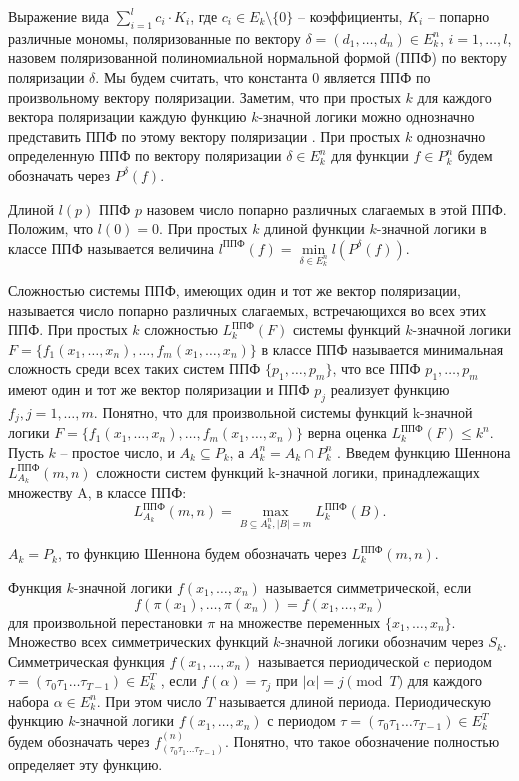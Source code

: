 \documentclass[bibliography=totoc, a4paper, 12pt]{extarticle}
\begin{document}
Выражение вида $\sum\limits_{i=1}^lc_i \cdot K_i$, где $c_i \in
E_k\setminus\{0\}$ -- коэффициенты, $K_i$ -- попарно различные мономы,
поляризованные по вектору $\delta = (d_1, \dots, d_n) \in E_k^n$, $i = 1, \dots,
l$, назовем поляризованной полиномиальной нормальной формой (ППФ) по вектору
поляризации $\delta$. Мы будем считать, что константа 0 является ППФ по
произвольному вектору поляризации. Заметим, что при простых $k$ для каждого
вектора поляризации каждую функцию $k$\nobreakdash-значной логики можно
однозначно представить ППФ по этому вектору поляризации \cite{ss02}. При простых
$k$ однозначно определенную ППФ по вектору поляризации $\delta \in E_k^n$ для
функции $f \in P_k^n$ будем обозначать через $P^{\delta}(f)$.

Длиной $l(p)$ ППФ $p$ назовем число попарно различных слагаемых в этой ППФ.
Положим, что $l(0) = 0$. При простых $k$ длиной функции $k$\nobreakdash-значной
логики в классе ППФ называется величина $l^{\text{ППФ}}(f) = \min\limits_{\delta
\in E_k^n}l(P^{\delta}(f))$.

Сложностью системы ППФ, имеющих один и тот же вектор поляризации, называется
число попарно различных слагаемых, встречающихся во всех этих ППФ. При простых
$k$ сложностью $L^\text{ППФ}_k(F)$ системы функций $k$-значной логики $F = \{f_1
(x_1, \ldots , x_n), \ldots, f_m(x_1 , \ldots, x_n)\}$ в классе ППФ называется
минимальная сложность среди всех таких систем ППФ $\{p_1 , \ldots , p_m \}$, что
все ППФ $p_1 , \ldots, p_m$ имеют один и тот же вектор поляризации и ППФ $p_j$
реализует функцию $f_j , j = 1, \ldots , m$. Понятно, что для произвольной
системы функций k-значной логики $F = \{f_1(x_1, \ldots , x_n), \ldots, f_m(x_1 ,
\ldots, x_n)\}$ верна оценка $L^\text{ППФ}_k(F) \leqslant k^n$. Пусть $k$ --
простое число, и $A_k \subseteq P_k$, а $A^n_k = A_k \cap P^n_k$ . Введем
функцию Шеннона $L^\text{ППФ}_{A_k}(m,n)$ сложности систем функций k-значной
логики, принадлежащих множеству A, в классе ППФ: \[ L^\text{ППФ}_{A_k}(m,n) =
\max_{B \subseteq A_k^n, |B|=m}L^\text{ППФ}_k(B). \]

 $A_k = P_k$, то функцию Шеннона будем обозначать через
$L^\text{ППФ}_k(m,n)$.

Функция $k$\nobreakdash-значной логики $f(x_1 ,\dots , x_n)$ называется
симметрической, если $$f(\pi(x_1), \dots, \pi(x_n)) = f(x_1, \dots, x_n)$$ для
произвольной перестановки $\pi$ на множестве переменных $\{x_1 , \dots , x_n \}$.
Множество всех симметрических функций $k$\nobreakdash-значной логики обозначим
через $S_k$. Симметрическая функция $f(x_1, \dots, x_n)$ называется
периодической c периодом $\tau = (\tau_0 \tau_1 \dots \tau_{T-1}) \in E_k^T$ ,
если $f(\alpha) = \tau_j$ при $|\alpha| = j \pmod T$ для каждого набора $\alpha
\in E_k^n$. При этом число $T$ называется длиной периода. Периодическую функцию
$k$\nobreakdash-значной логики $f(x_1 , \dots , x_n)$ с периодом $\tau = (\tau_0
\tau_1 \dots \tau_{T-1}) \in E_k^T$ будем обозначать через $f^{(n)}_{(\tau_0
\tau_1 \dots \tau_{T-1})}$. Понятно, что такое обозначение полностью определяет
эту функцию.
\end{document}
